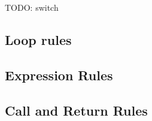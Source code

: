 \documentclass[acmsmall,review,anonymous]{acmart}\settopmatter{printfolios=true,printccs=false,printacmref=false}
\begin{document}
\ifstepa
\ifstepb

TODO: switch

\subsection{Loop rules}

\whilestep
\whiletruestep
\whilefalsestep
\whileskipcontinuestep
\whilebreakstep

\dowhilestep
\dowhileskipcontinuestep
\dowhilefalsestep
\dowhiletruestep
\dowhilebreakstep

\forinitstep
\forstep
\forfalsestep
\fortruestep
\forskiporcontinuestep
\forbreakstep
\forskippoststep

\subsection{Expression Rules}

\allocstep
\valofstep
\assignopstep
\postincstep
\assignstep
\varstep
\unopstep
\binopstep
\callexprstep

\subsection{Call and Return Rules}

\callstep
\returnstep
\end{document}
